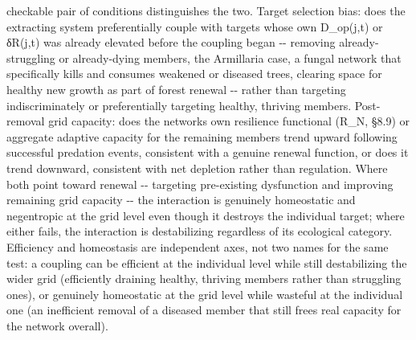 \documentclass[
]{article}
\begin{document}
checkable pair of conditions distinguishes the two. Target selection
bias: does the extracting system preferentially couple with targets
whose own D\_op(j,t) or δR(j,t) was already elevated before the coupling
began -\/- removing already-struggling or already-dying members, the
Armillaria case, a fungal network that specifically kills and consumes
weakened or diseased trees, clearing space for healthy new growth as
part of forest renewal -\/- rather than targeting indiscriminately or
preferentially targeting healthy, thriving members. Post-removal grid
capacity: does the networks own resilience functional (R\_N, §8.9) or
aggregate adaptive capacity for the remaining members trend upward
following successful predation events, consistent with a genuine renewal
function, or does it trend downward, consistent with net depletion
rather than regulation. Where both point toward renewal -\/- targeting
pre-existing dysfunction and improving remaining grid capacity -\/- the
interaction is genuinely homeostatic and negentropic at the grid level
even though it destroys the individual target; where either fails, the
interaction is destabilizing regardless of its ecological category.
Efficiency and homeostasis are independent axes, not two names for the
same test: a coupling can be efficient at the individual level while
still destabilizing the wider grid (efficiently draining healthy,
thriving members rather than struggling ones), or genuinely homeostatic
at the grid level while wasteful at the individual one (an inefficient
removal of a diseased member that still frees real capacity for the
network overall).
\end{document}
